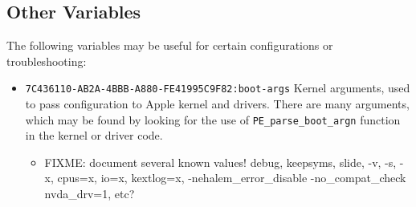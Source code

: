 \documentclass[]{article}
\providecommand{\tightlist}{%
  \setlength{\itemsep}{0pt}\setlength{\parskip}{0pt}}
\begin{document}
\subsection{Other Variables}\label{nvramvarsother}

The following variables may be useful for certain configurations or
troubleshooting:

\begin{itemize}
\tightlist
\item
  \texttt{7C436110-AB2A-4BBB-A880-FE41995C9F82:boot-args}
  \break
  Kernel arguments, used to pass configuration to Apple kernel and drivers.
  There are many arguments, which may be found by looking for the use of
  \texttt{PE\_parse\_boot\_argn} function in the kernel or driver code.

  \begin{itemize}
  \item FIXME: document several known values! debug, keepsyms, slide, -v, -s,
  -x, cpus=x, io=x, kextlog=x, -nehalem\_error\_disable -no\_compat\_check nvda\_drv=1, etc?
  \end{itemize}


\end{itemize}
\end{document}

